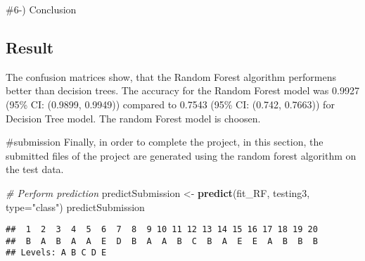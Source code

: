 \documentclass[
]{article}
\newenvironment{Shaded}{\begin{snugshade}}{\end{snugshade}}
\newcommand{\AttributeTok}[1]{\textcolor[rgb]{0.13,0.29,0.53}{#1}}
\newcommand{\CommentTok}[1]{\textcolor[rgb]{0.56,0.35,0.01}{\textit{#1}}}
\newcommand{\FunctionTok}[1]{\textcolor[rgb]{0.13,0.29,0.53}{\textbf{#1}}}
\newcommand{\NormalTok}[1]{#1}
\newcommand{\OtherTok}[1]{\textcolor[rgb]{0.56,0.35,0.01}{#1}}
\newcommand{\StringTok}[1]{\textcolor[rgb]{0.31,0.60,0.02}{#1}}
\begin{document}
\#6-) Conclusion

\hypertarget{result}{%
\subsection{Result}\label{result}}

The confusion matrices show, that the Random Forest algorithm performens
better than decision trees. The accuracy for the Random Forest model was
0.9927 (95\% CI: (0.9899, 0.9949)) compared to 0.7543 (95\% CI: (0.742,
0.7663)) for Decision Tree model. The random Forest model is choosen.

\#submission Finally, in order to complete the project, in this section,
the submitted files of the project are generated using the random forest
algorithm on the test data.

\begin{Shaded}
\begin{Highlighting}[]
\CommentTok{\# Perform prediction}
\NormalTok{predictSubmission }\OtherTok{\textless{}{-}} \FunctionTok{predict}\NormalTok{(fit\_RF, testing3, }\AttributeTok{type=}\StringTok{"class"}\NormalTok{)}
\NormalTok{predictSubmission}
\end{Highlighting}
\end{Shaded}

\begin{verbatim}
##  1  2  3  4  5  6  7  8  9 10 11 12 13 14 15 16 17 18 19 20 
##  B  A  B  A  A  E  D  B  A  A  B  C  B  A  E  E  A  B  B  B 
## Levels: A B C D E
\end{verbatim}
\end{document}
